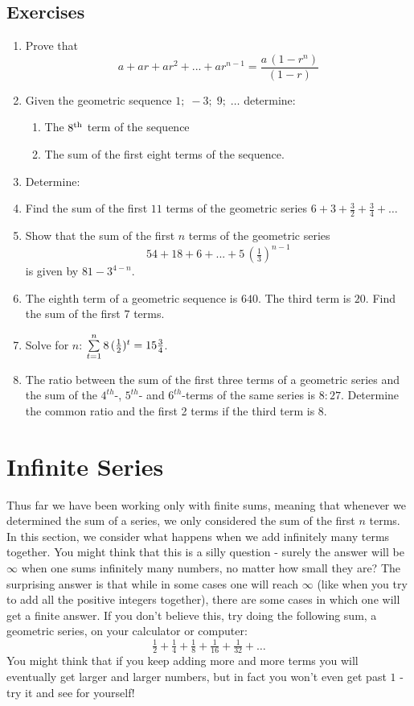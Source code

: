 \subsection{Exercises}
\begin{enumerate}
\item Prove that $$a + ar + ar^2 + ... + ar^{n-1} = \dfrac{a\,(1 - r^n)}{(1-r)}$$
\item{Given the geometric sequence $1;\;-3;\; 9;\;\dots$ determine:
\begin{enumerate}
\item{The $8^{\rm{th}}$ term of the sequence}
\item{The sum of the first eight terms of the sequence.}
\end{enumerate}}
\item{Determine:
}
\item Find the sum of the first $11$ terms of the geometric series $6 + 3 + \tfrac{3}{2} + \tfrac{3}{4} + \ldots$
\item Show that the sum of the first $n$ terms of the geometric series $$54 + 18 + 6 + ... + 5 \, (\tfrac{1}{3})^{n-1}$$ is given by $81 - 3^{4-n}$.
\item The eighth term of a geometric sequence is $640$. The third term is $20$. Find the sum of the first 7 terms.
\item Solve for $n$: $\sum_{t=1}^n \limits 8 \, (\tfrac{1}{2})^t = 15\tfrac{3}{4}$.
\item The ratio between the sum of the first three terms of a geometric series and the sum of the $4^{th}$-, $5^{th}$- and $6^{th}$-terms of the same series is $8:27$. Determine the common ratio and the first 2 terms if the third term is $8$.


\end{enumerate}

\section{Infinite Series}
Thus far we have been working only with finite sums, meaning that whenever we determined the sum of a series, we only considered the sum of the first $n$ terms. In this section, we consider what happens when we add infinitely many terms together. You might think that this is a silly question - surely the answer will be $\infty$ when one sums infinitely many numbers, no matter how small they are? The surprising answer is that while in some cases one will reach $\infty$ (like when you try to add all the positive integers together), there are some cases in which one will get a finite answer. If you don't believe this, try doing the following sum, a geometric series, on your calculator or computer:
$$\tfrac{1}{2} + \tfrac{1}{4} + \tfrac{1}{8} + \tfrac{1}{16} + \tfrac{1}{32} + \ldots $$
You might think that if you keep adding more and more terms you will eventually get larger and larger numbers, but in fact you won't even get past $1$ - try it and see for yourself!

